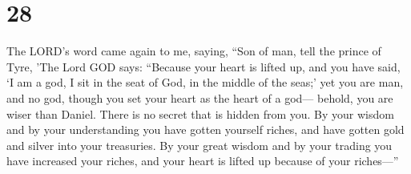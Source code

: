 \hypertarget{section-26}{%
\section{28}\label{section-26}}

 The LORD's word came again to me, saying, 
``Son of man, tell the prince of Tyre, 'The Lord GOD says: ``Because
your heart is lifted up, and you have said, `I am a god, I sit in the
seat of God, in the middle of the seas;' yet you are man, and no god,
though you set your heart as the heart of a god--- 
behold, you are wiser than Daniel. There is no secret that is hidden
from you.  By your wisdom and by your understanding you
have gotten yourself riches, and have gotten gold and silver into your
treasuries.  By your great wisdom and by your trading you
have increased your riches, and your heart is lifted up because of your
riches---''

